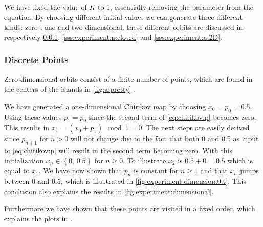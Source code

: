 We have fixed the value of $K$ to 1, essentially removing the parameter from the equation. By choosing different initial values we can generate three different kinds: zero-, one and two-dimensional, these different orbits are discussed in respectively \cref{sss:experiment:a:discrete}, \ref{sss:experiment:a:closed} and \ref{sss:experiment:a:2D}.



\subsubsection{Discrete Points}
\label{sss:experiment:a:discrete}
Zero-dimensional orbits consist of a finite number of points, which are found in the centers of the islands in \cref{fig:a:pretty} \cite{kenzel1997physics}. 

We have generated a one-dimensional Chirikov map by choosing $x_0 = p_0 = 0.5$. Using these values $p_1 = p_0$ since the second term of \eqref{eq:chirikov:p} becomes zero. This results in $x_1 = \left( x_0 + p_{1} \right) \mod 1= 0$. The next steps are easily derived since $p_{n + 1}$ for $n > 0$ will not change due to the fact that both 0 and 0.5 as input to \eqref{eq:chirikov:p} will result in the second term becoming zero. With this initialization $x_{n} \in \left\{0,\, 0.5 \right\} \text{ for } n \geq 0$. To illustrate $x_2$ is $0.5 + 0 = 0.5$ which is equal to $x_1$. We have now shown that $p_n$ is constant for $n \geq 1$ and that $x_n$ jumps between 0 and 0.5, which is illustrated in \cref{fig:experiment:dimension:0:t}. This conclusion also explains the results in \cref{fig:experiment:dimension:0}. 

Furthermore we have shown that these points are visited in a fixed order, which explains the plots in .\\


